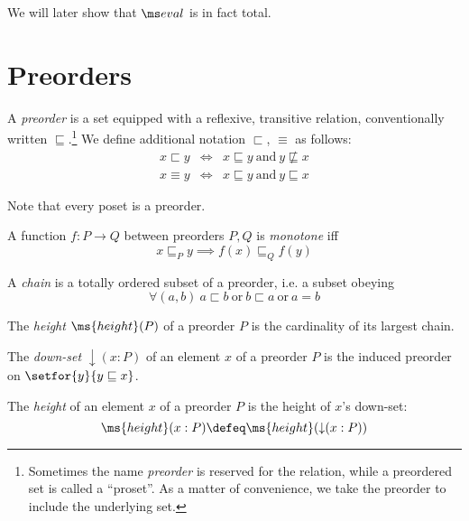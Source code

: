 \documentclass{article}
\renewcommand{\land}{~\text{and}~}
\renewcommand{\lor}{~\text{or}~}
\newcommand{\ale}{\sqsubseteq}
\newcommand{\alt}{\sqsubset}
\newcommand{\aeq}{\equiv}
\newcommand{\eqposet}[1]{\ms{Eq}(#1)}
\renewcommand{\eqposet}[1]{\|{#1}\|}
\newcommand{\height}{\ms{height}}
\newcommand{\elemheight}[2]{\height(#2 : #1)}
\newcommand{\down}[2]{\mathop{\downarrow}(#2 : #1)}
\begin{document}
We will later show that $\evalfn$ is in fact total.



\section{Preorders}

\begin{definition}
  A \emph{preorder} is a set equipped with a reflexive, transitive relation,
  conventionally written $\ale$.\footnote{Sometimes the name \emph{preorder} is
    reserved for the relation, while a preordered set is called a ``proset''. As
    a matter of convenience, we take the preorder to include the underlying
    set.} We define additional notation $\alt$, $\aeq$ as follows:
  \begin{eqnarray*}
    x \alt y &\iff& x \ale y \land y \not\ale x\\
    x \aeq y &\iff& x \ale y \land y \ale x
  \end{eqnarray*}

  Note that every poset is a preorder.
\end{definition}

\begin{definition}
  A function $f : P \to Q$ between preorders $P,Q$ is \emph{monotone} iff
  \[ x \ale_P y \implies f(x) \ale_Q f(y) \]
\end{definition}

\begin{definition}
  A \emph{chain} is a totally ordered subset of a preorder, i.e. a subset
  obeying \[\forall(a, b)\ a \alt b \lor b \alt a \lor a = b \]
\end{definition}

\begin{definition}
  The \emph{height} $\height(P)$ of a preorder $P$ is the cardinality of its largest chain.
\end{definition}


\begin{definition}
  The \emph{down-set} $\down{P}{x}$ of an element $x$ of a preorder $P$ is the
  induced preorder on $\setfor{y}{y \ale x}$.
\end{definition}

\begin{definition}
  The \emph{height} of an element $x$ of a preorder $P$ is the height of $x$'s
  down-set: \[\elemheight{P}{x} \defeq \height(\down{P}{x})\]
\end{definition}
\end{document}
